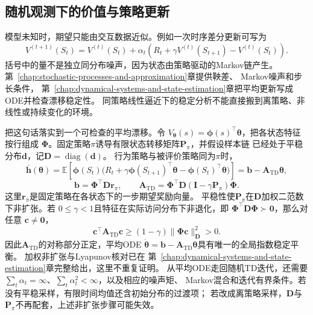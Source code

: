 \subsection{随机观测下的价值与策略更新}
\label{sec:future-random-observations-value-policy-updates}

模型未知时，期望只能由交互数据近似。例如一次时序差分更新可写为
\[
  V^{(t+1)}(S_t)
  =
  V^{(t)}(S_t)
  +
  \alpha_t
  \left(
    R_t+\gamma V^{(t)}(S_{t+1})-V^{(t)}(S_t)
  \right).
\]
括号中的量不是独立同分布噪声，因为状态由策略驱动的Markov链产生。
第~\ref{chap:stochastic-processes-and-approximation}章提供鞅差、
Markov噪声和步长条件，
第~\ref{chap:dynamical-systems-and-state-estimation}章把平均更新写成ODE并检查漂移稳定性。
同策略线性逼近下的稳定分析不能直接搬到离策略、非线性或持续变化的环境。

把这句话落实到一个可检查的平均漂移。令
\(V_{\bm\theta}(s)=\bm\phi(s)^{\top}\bm\theta\)，把各状态特征按行组成
\(\bm\Phi\)。固定策略\(\pi\)诱导有限状态转移矩阵\(\bm P_\pi\)，并假设样本链
已经处于平稳分布\(\bm d\)，记\(\bm D=\operatorname{diag}(\bm d)\)。
行为策略与被评价策略同为\(\pi\)时，
\[
  \overline{\bm h}(\bm\theta)
  =
  \mathbb{E}\!\left[
    \bm\phi(S_t)
    \bigl(
      R_t+\gamma\bm\phi(S_{t+1})^{\top}\bm\theta
      -\bm\phi(S_t)^{\top}\bm\theta
    \bigr)
  \right]
  =
  \bm b-\bm A_{\mathrm{TD}}\bm\theta,
\]
\[
  \bm b=\bm\Phi^{\top}\bm D\bm r_\pi,
  \qquad
  \bm A_{\mathrm{TD}}
  =
  \bm\Phi^{\top}\bm D
  (\bm I-\gamma\bm P_\pi)\bm\Phi.
\]
这里\(\bm r_\pi\)是固定策略在各状态下的一步期望奖励向量。
平稳性使\(\bm P_\pi\)在\(\bm D\)加权二范数下非扩张。若
\(0\leq\gamma<1\)且特征在实际访问分布下非退化，即
\(\bm\Phi^{\top}\bm D\bm\Phi\succ\bm0\)，那么对任意
\(\bm c\neq\bm0\)，
\[
  \bm c^{\top}\bm A_{\mathrm{TD}}\bm c
  \geq
  (1-\gamma)
  \lVert\bm\Phi\bm c\rVert_{\bm D}^{2}
  >
  0.
\]
因此\(\bm A_{\mathrm{TD}}\)的对称部分正定，平均ODE
\(\dot{\bm\theta}=\bm b-\bm A_{\mathrm{TD}}\bm\theta\)具有唯一的全局指数稳定平衡。
加权非扩张与Lyapunov核对已在
第~\ref{chap:dynamical-systems-and-state-estimation}章完整给出，这里不重复证明。
从平均ODE走回随机TD迭代，还需要
\(\sum_t\alpha_t=\infty\)、\(\sum_t\alpha_t^2<\infty\)，以及相应的噪声矩、
Markov混合和迭代有界条件。若没有平稳采样，有限时间均值还含初始分布的过渡项；
若改成离策略采样，\(\bm D\)与\(\bm P_\pi\)不再配套，上述非扩张步骤可能失效。

